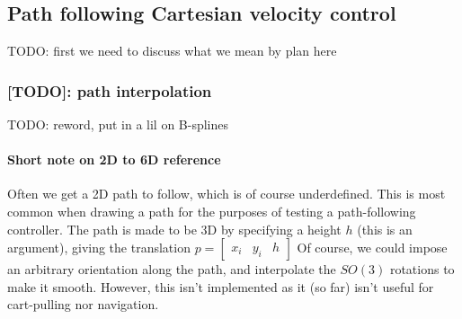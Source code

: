 \subsection{Path following Cartesian velocity control}
TODO:
first we need to discuss what we mean by plan here

\subsubsection{[TODO]: path interpolation}
TODO: reword, put in a lil on B-splines


%
%



\paragraph{Short note on 2D to 6D reference}
Often we get a 2D path to follow, which is of course underdefined.
This is most common when drawing a path for the purposes of testing a path-following controller.
The path is made to be 3D by specifying a height $ h  $ (this is an argument),
giving the translation $ p = \begin{bmatrix} x_{ i } & y_{ i } & h \end{bmatrix}   $
Of course, we could impose an arbitrary orientation along the path,
and interpolate the $ SO (3)  $ rotations to make it smooth. 
However, this isn't implemented as it (so far) isn't useful for cart-pulling nor navigation.

